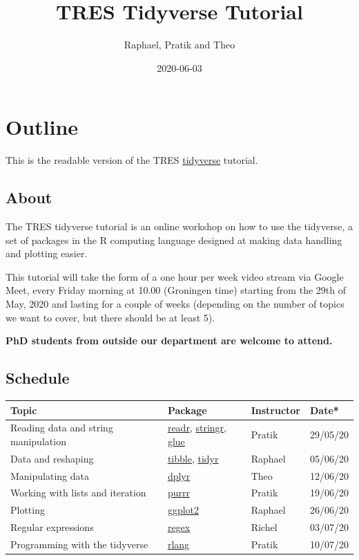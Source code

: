 \documentclass[]{book}
\title{TRES Tidyverse Tutorial}
\author{Raphael, Pratik and Theo}
\date{2020-06-03}
\begin{document}
\maketitle


\linenumbers

{
\setcounter{tocdepth}{1}
\tableofcontents
}
\hypertarget{outline}{%
\chapter*{Outline}\label{outline}}

This is the readable version of the TRES \href{https://www.tidyverse.org/}{tidyverse} tutorial.

\hypertarget{about}{%
\section*{About}\label{about}}

The TRES tidyverse tutorial is an online workshop on how to use the tidyverse, a set of packages in the R computing language designed at making data handling and plotting easier.

This tutorial will take the form of a one hour per week video stream via Google Meet, every Friday morning at 10.00 (Groningen time) starting from the 29th of May, 2020 and lasting for a couple of weeks (depending on the number of topics we want to cover, but there should be at least 5).

\textbf{PhD students from outside our department are welcome to attend.}

\hypertarget{schedule}{%
\section*{Schedule}\label{schedule}}

\begin{longtable}[]{@{}llll@{}}
\toprule
Topic & Package & Instructor & Date*\tabularnewline
\midrule
\endhead
Reading data and string manipulation & \href{https://readr.tidyverse.org/}{readr}, \href{https://stringr.tidyverse.org/}{stringr}, \href{https://github.com/tidyverse/glue}{glue} & Pratik & 29/05/20\tabularnewline
Data and reshaping & \href{https://tibble.tidyverse.org/}{tibble}, \href{https://tidyr.tidyverse.org/}{tidyr} & Raphael & 05/06/20\tabularnewline
Manipulating data & \href{https://dplyr.tidyverse.org/}{dplyr} & Theo & 12/06/20\tabularnewline
Working with lists and iteration & \href{https://purrr.tidyverse.org/}{purrr} & Pratik & 19/06/20\tabularnewline
Plotting & \href{https://ggplot2.tidyverse.org/}{ggplot2} & Raphael & 26/06/20\tabularnewline
Regular expressions & \href{https://stat.ethz.ch/R-manual/R-devel/library/base/html/regex.html}{regex} & Richel & 03/07/20\tabularnewline
Programming with the tidyverse & \href{https://rlang.r-lib.org/}{rlang} & Pratik & 10/07/20\tabularnewline
\bottomrule
\end{longtable}
\end{document}

